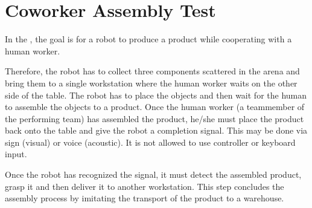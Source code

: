 
\section{Coworker Assembly Test}

In the , 
the goal is for a robot to produce a product while cooperating with a human worker.

Therefore, the robot has to collect three components scattered in the arena and bring them to a single workstation where the human worker waits on the other side of the table.
The robot has to place the objects and then wait for the human to assemble the objects to a product.
Once the human worker (a teammember of the performing team) has assembled the product, he/she must place the product back onto the table and give the robot a completion signal. This may be done via sign (visual) or voice (acoustic). It is not allowed to use controller or keyboard input.

Once the robot has recognized the signal, 
it must detect the assembled product, grasp it and then deliver it to another workstation.
This step concludes the assembly process by imitating the transport of the product to a warehouse.
